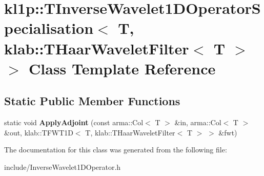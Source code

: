 \hypertarget{classkl1p_1_1TInverseWavelet1DOperatorSpecialisation_3_01T_00_01klab_1_1THaarWaveletFilter_3_01T_01_4_01_4}{}\section{kl1p\+:\+:T\+Inverse\+Wavelet1\+D\+Operator\+Specialisation$<$ T, klab\+:\+:T\+Haar\+Wavelet\+Filter$<$ T $>$ $>$ Class Template Reference}
\label{classkl1p_1_1TInverseWavelet1DOperatorSpecialisation_3_01T_00_01klab_1_1THaarWaveletFilter_3_01T_01_4_01_4}
\subsection*{Static Public Member Functions}
\begin{DoxyCompactItemize}
\item 
static void {\bfseries Apply\+Adjoint} (const arma\+::\+Col$<$ T $>$ \&in, arma\+::\+Col$<$ T $>$ \&out, klab\+::\+T\+F\+W\+T1D$<$ T, klab\+::\+T\+Haar\+Wavelet\+Filter$<$ T $>$ $>$ \&fwt)\hypertarget{classkl1p_1_1TInverseWavelet1DOperatorSpecialisation_3_01T_00_01klab_1_1THaarWaveletFilter_3_01T_01_4_01_4_af80266d04d7629b4844d45fecac7fbec}{}\label{classkl1p_1_1TInverseWavelet1DOperatorSpecialisation_3_01T_00_01klab_1_1THaarWaveletFilter_3_01T_01_4_01_4_af80266d04d7629b4844d45fecac7fbec}

\end{DoxyCompactItemize}


The documentation for this class was generated from the following file\+:\begin{DoxyCompactItemize}
\item 
include/Inverse\+Wavelet1\+D\+Operator.\+h\end{DoxyCompactItemize}
